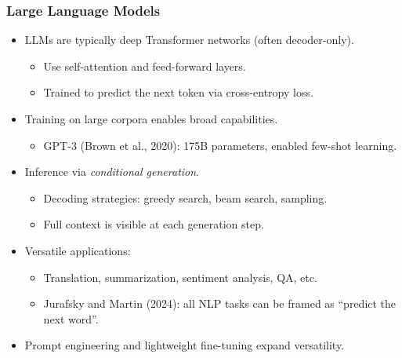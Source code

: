 \subsubsection*{Large Language Models}

\begin{itemize}
  \item LLMs are typically deep Transformer networks (often decoder-only).
        \begin{itemize}
          \item Use self-attention and feed-forward layers.
          \item Trained to predict the next token via cross-entropy loss.
        \end{itemize}
  \item Training on large corpora enables broad capabilities.
        \begin{itemize}
          \item GPT-3 (Brown et al., 2020): 175B parameters, enabled few-shot learning.
        \end{itemize}
  \item Inference via \textit{conditional generation}.
        \begin{itemize}
          \item Decoding strategies: greedy search, beam search, sampling.
          \item Full context is visible at each generation step.
        \end{itemize}
  \item Versatile applications:
        \begin{itemize}
          \item Translation, summarization, sentiment analysis, QA, etc.
          \item Jurafsky and Martin (2024): all NLP tasks can be framed as “predict the next word”.
        \end{itemize}
  \item Prompt engineering and lightweight fine-tuning expand versatility.
\end{itemize}

